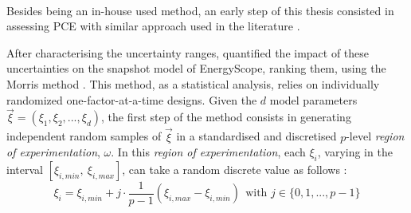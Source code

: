 \begin{table}[htbp!]
\caption{Total Sobol' indices of the uncertain parameters over the total transition cost via \gls{PCE} of orders 2 and 1 having a \gls{LOO} error of 1\% and 16\%, respectively. The similar rankings (and indices) show the validity of using the faster (even though less accurate) lower order \gls{PCE} to rank the most impacting uncertain parameters.}
\label{tab:methodo:Sobol_ranking_order_1_2}
\begin{minipage}{\textwidth}
\centering
{}
\end{minipage}
\end{table}





\\

\noindent
Besides being an in-house used method, an early step of this thesis consisted in assessing \gls{PCE} with similar approach used in the literature \cite{limpens2020impact}. 

After characterising the uncertainty ranges, \citet{Moret2017} quantified the impact of these uncertainties on the snapshot model of EnergyScope,  \ie ranking them, using the Morris method \cite{morris_factorial_1991}.  This method, as a statistical analysis, relies on individually randomized one-factor-at-a-time designs. Given the $d$ model parameters $\vec{\xi}=(\xi_1,\xi_2,...,\xi_d)$, the first step of the method consists in generating independent random samples of $\vec{\xi}$ in a standardised and discretised $p$-level \textit{region of experimentation}, $\omega$. In this \textit{region of experimentation}, each $\xi_i$, varying in the interval $[\xi_{i,min},~\xi_{i,max}]$, can take a random discrete value as follows :
\begin{equation}
  \xi_{i}=\xi_{i,min}+j\cdot\frac{1}{p-1}\left(\xi_{i,max}-\xi_{i,min}\right)~~\text{with }j\in\{0,1,...,p-1\}
\end{equation}


